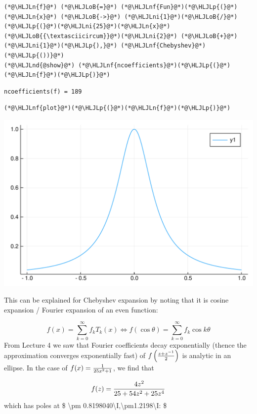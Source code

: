 \documentclass[12pt,a4paper]{article}
\newcommand{\HLJLn}[1]{#1}
\newcommand{\HLJLnd}[1]{\textcolor[RGB]{214,102,97}{#1}}
\newcommand{\HLJLnf}[1]{\textcolor[RGB]{66,102,213}{#1}}
\newcommand{\HLJLni}[1]{\textcolor[RGB]{59,151,46}{#1}}
\newcommand{\HLJLoB}[1]{\textcolor[RGB]{102,102,102}{\textbf{#1}}}
\newcommand{\HLJLp}[1]{#1}
\begin{document}
\begin{lstlisting}
(*@\HLJLn{f}@*) (*@\HLJLoB{=}@*) (*@\HLJLnf{Fun}@*)(*@\HLJLp{(}@*) (*@\HLJLn{x}@*) (*@\HLJLoB{->}@*) (*@\HLJLni{1}@*)(*@\HLJLoB{/}@*)(*@\HLJLp{(}@*)(*@\HLJLni{25}@*)(*@\HLJLn{x}@*)(*@\HLJLoB{{\textasciicircum}}@*)(*@\HLJLni{2}@*) (*@\HLJLoB{+}@*) (*@\HLJLni{1}@*)(*@\HLJLp{),}@*) (*@\HLJLnf{Chebyshev}@*)(*@\HLJLp{())}@*)
(*@\HLJLnd{@show}@*) (*@\HLJLnf{ncoefficients}@*)(*@\HLJLp{(}@*)(*@\HLJLn{f}@*)(*@\HLJLp{)}@*)
\end{lstlisting}

\begin{lstlisting}
ncoefficients(f) = 189
\end{lstlisting}


\begin{lstlisting}
(*@\HLJLnf{plot}@*)(*@\HLJLp{(}@*)(*@\HLJLn{f}@*)(*@\HLJLp{)}@*)
\end{lstlisting}

\includegraphics[width=\linewidth]{figures/Lecture21_12_1.pdf}

This can be explained for Chebyshev expansion by noting that it is cosine expansion / Fourier expansion of an even function:

\[
f(x) = \sum_{k=0}^\infty f_k T_k(x) \Leftrightarrow f(\cos \theta) = \sum_{k=0}^\infty f_k \cos k \theta
\]
From Lecture 4 we saw that Fourier coefficients decay exponentially (thence the approximation converges exponentially fast) of   $f\left({z + z^{-1} \over 2}\right)$ is analytic in an ellipse. In the case of $f(x) = {1 \over 25 x^2 + 1}$, we find that 

\[
f(z) = {4 z^2 \over 25 + 54 z^2 + 25 z^4}
\]
which has poles at  \$ {\textbackslash}pm 0.8198040{\textbackslash}I,{\textbackslash}pm1.2198{\textbackslash}I: \$
\end{document}
